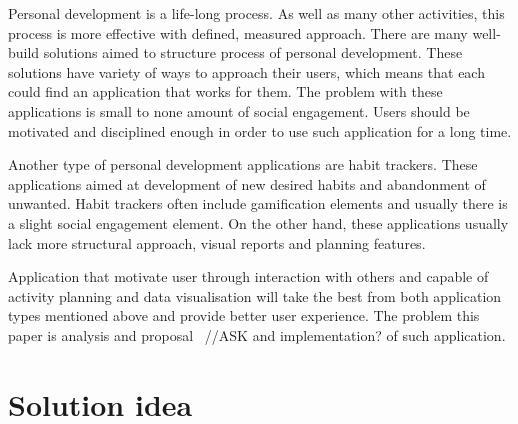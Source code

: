 Personal development is a life-long process.
As well as many other activities, this process is more effective with defined, measured approach.
There are many well-build solutions aimed to structure process of personal development.
These solutions have variety of ways to approach their users, which means that each could find an application that works for them.
The problem with these applications is small to none amount of social engagement.
Users should be motivated and disciplined enough in order to use such application for a long time.

Another type of personal development applications are habit trackers.
These applications aimed at development of new desired habits and abandonment of unwanted.
Habit trackers often include gamification elements and usually there is a slight social engagement element.
On the other hand, these applications usually lack more structural approach, visual reports and planning features.

Application that motivate user through interaction with others and capable of activity planning and data visualisation
will take the best from both application types mentioned above and provide better user experience.
The problem this paper is analysis and proposal ~{\color{gray}//ASK and implementation?} of such application.

\section{Solution idea}\label{sec:solution-idea}

